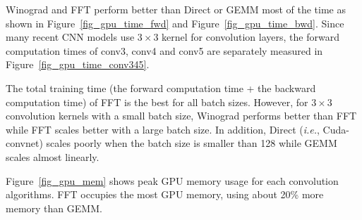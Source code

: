 \textsf{Winograd} and \textsf{FFT} perform better than \textsf{Direct} or \textsf{GEMM} most of the time as shown in Figure~\ref{fig_gpu_time_fwd} and Figure~\ref{fig_gpu_time_bwd}. Since many recent CNN models use $3 \times 3$ kernel for convolution layers\cite{vgg}, the forward computation times of \textsf{conv3},  \textsf{conv4} and \textsf{conv5} are separately measured in Figure~\ref{fig_gpu_time_conv345}.

The total training time (the forward computation time + the backward computation time) of \textsf{FFT} is the best for all batch sizes. However, for $3 \times 3$ convolution kernels with a small batch size, \textsf{Winograd} performs better than \textsf{FFT} while \textsf{FFT} scales better with a large batch size. In addition, \textsf{Direct} (\textit{i.e.}, Cuda-convnet) scales poorly when the batch size is smaller than 128 while \textsf{GEMM} scales almost linearly.

Figure~\ref{fig_gpu_mem} shows peak GPU memory usage for each convolution algorithms. \textsf{FFT} occupies the most GPU memory, using about 20\% more memory than \textsf{GEMM}. 

